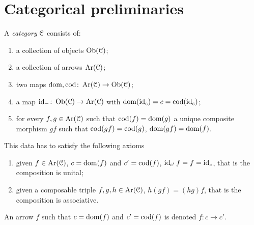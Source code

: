 \documentclass[a4paper,11pt,oneside,openany]{scrbook}
\begin{document}
	\mainmatter
	

	
	\chapter*{Categorical preliminaries}
	\begin{defn}[Categories]
		A \emph{category} $\C$ consists of:
		\begin{enumerate}
			\item a collection of objects $\Ob(\C)$;
			\item a collection of arrows $\Ar(\C)$;
			\item two maps $\dom,\cod\colon\Ar(\C)\rightarrow\Ob(\C)$;
			\item a map $\id_{-}\colon\Ob(\C)\rightarrow\Ar(\C)$ with $\dom(\id_{c})=c=\cod(\id_{c})$;
			\item for every $f,g\in\Ar(\C)$ such that $\cod(f)=\dom(g)$ a unique composite morphism $gf$ such that $\cod(gf)=\cod(g)$, $\dom(gf)=\dom(f)$.
		\end{enumerate}
	This data has to satisfy the following axioms
		\begin{enumerate}
			\item given $f\in\Ar(\C)$, $c=\dom(f)$ and $c'=\cod(f)$, $\id_{c'}f=f=\id_{c}$, that is the composition is unital;
			\item given a composable triple $f,g,h\in\Ar(\C)$, $h(gf)=(hg)f$, that is the composition is associative.
		\end{enumerate}
		An arrow $f$ such that $c=\dom(f)$ and $c'=\cod(f)$ is denoted $f\colon c\rightarrow c'$.
	\end{defn}
	
	\begin{defn}[Functors]
		
	\end{defn}
	
	\begin{defn}
		
	\end{defn}
	
	\begin{defn}
		
	\end{defn}
	
	\begin{defn}
	\end{defn}
	
	\begin{defn}
		
	\end{defn}
	
\end{document}
